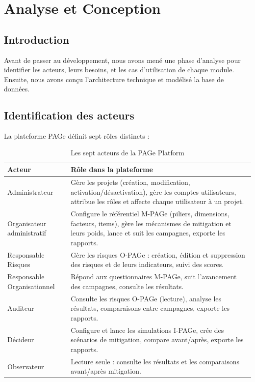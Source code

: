 \chapter{Analyse et Conception}

\section{Introduction}
Avant de passer au développement, nous avons mené une phase d'analyse pour identifier les acteurs, leurs besoins, et les cas d'utilisation de chaque module. Ensuite, nous avons conçu l'architecture technique et modélisé la base de données.

\section{Identification des acteurs}
La plateforme PAGe définit sept rôles distincts :

\begin{table}[H]
\centering
\renewcommand{\arraystretch}{1.4}
\begin{tabular}{@{}p{}p{}@{}}
\hline
\textbf{Acteur} & \textbf{Rôle dans la plateforme} \\
\hline
Administrateur & Gère les projets (création, modification, activation/désactivation), gère les comptes utilisateurs, attribue les rôles et affecte chaque utilisateur à un projet. \\ 
\hline
Organisateur administratif & Configure le référentiel M-PAGe (piliers, dimensions, facteurs, items), gère les mécanismes de mitigation et leurs poids, lance et suit les campagnes, exporte les rapports. \\
\hline
Responsable Risques & Gère les risques O-PAGe : création, édition et suppression des risques et de leurs indicateurs, suivi des scores. \\
\hline
Responsable Organisationnel & Répond aux questionnaires M-PAGe, suit l'avancement des campagnes, consulte les résultats. \\
\hline
Auditeur & Consulte les risques O-PAGe (lecture), analyse les résultats, comparaisons entre campagnes, exporte les rapports. \\
\hline
Décideur & Configure et lance les simulations I-PAGe, crée des scénarios de mitigation, compare avant/après, exporte les rapports. \\
\hline
Observateur & Lecture seule : consulte les résultats et les comparaisons avant/après mitigation. \\
\hline
\end{tabular}
\caption{Les sept acteurs de la PAGe Platform}
\end{table}

